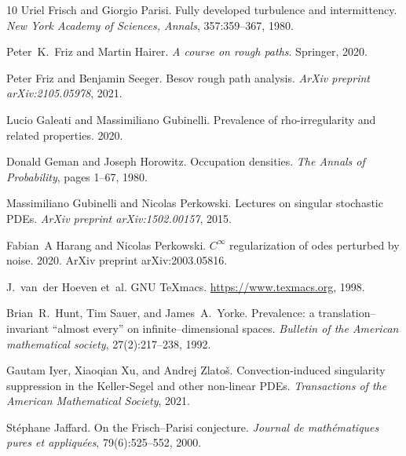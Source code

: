 \documentclass[11pt,oneside,reqno]{amsart}
\newcommand{\tmtextit}[1]{{{\itshape{#1}}}}
\numberwithin{equation}{section}
\begin{document}
\begin{thebibliography}{10}
  Uriel Frisch  and  Giorgio Parisi. {\newblock}Fully
  developed turbulence and intermittency. {\newblock}\tmtextit{New York
  Academy of Sciences, Annals}, 357:359--367, 1980.{\newblock}
  
  Peter~K.~Friz  and  Martin Hairer.
  {\newblock}\tmtextit{A course on rough paths}. {\newblock}Springer,
  2020.{\newblock}
  
  Peter Friz  and  Benjamin Seeger. {\newblock}Besov
  rough path analysis. {\newblock}\tmtextit{ArXiv preprint arXiv:2105.05978},
  2021.{\newblock}
  
  Lucio Galeati  and  Massimiliano
  Gubinelli. {\newblock}Prevalence of rho-irregularity and related properties.
  {\newblock}2020.{\newblock}
  
  Donald Geman  and  Joseph Horowitz. {\newblock}Occupation
  densities. {\newblock}\tmtextit{The Annals of Probability},  pages  1--67,
  1980.{\newblock}
  
  Massimiliano Gubinelli  and  Nicolas
  Perkowski. {\newblock}Lectures on singular stochastic PDEs.
  {\newblock}\tmtextit{ArXiv preprint arXiv:1502.00157}, 2015.{\newblock}
  
  Fabian~A Harang  and  Nicolas Perkowski.
  {\newblock}$C^{\infty}$ regularization of odes perturbed by noise.
  {\newblock}2020. {\newblock}ArXiv preprint arXiv:2003.05816.{\newblock}
  
  J.~van~der Hoeven et~al. {\newblock}GNU
  TeXmacs. {\newblock}\url{https://www.texmacs.org}, 1998.{\newblock}
  
  Brian~R.~Hunt, Tim Sauer, and  James~A.~Yorke.
  {\newblock}Prevalence: a translation--invariant ``almost every'' on
  infinite--dimensional spaces. {\newblock}\tmtextit{Bulletin of the American
  mathematical society}, 27(2):217--238, 1992.{\newblock}
  
  Gautam Iyer, Xiaoqian Xu, and  Andrej Zlato{\v s}.
  {\newblock}Convection-induced singularity suppression in the Keller-Segel
  and other non-linear PDEs. {\newblock}\tmtextit{Transactions of the American
  Mathematical Society}, 2021.{\newblock}
  
  St{\'e}phane Jaffard. {\newblock}On the
  Frisch--Parisi conjecture. {\newblock}\tmtextit{Journal de math{\'e}matiques
  pures et appliqu{\'e}es}, 79(6):525--552, 2000.{\newblock}
  

\end{thebibliography}
\end{document}
